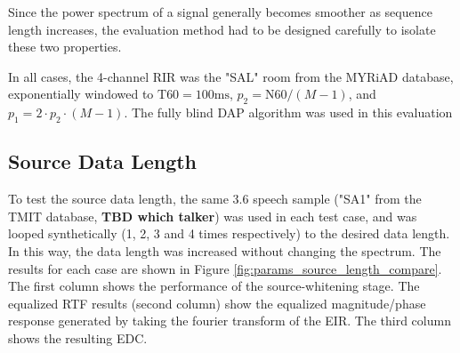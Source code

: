 Since the power spectrum of a signal generally becomes smoother as sequence length increases, the evaluation method had to be designed carefully to isolate these two properties.  

In all cases, the 4-channel RIR was the "SAL" room from the MYRiAD database, exponentially windowed to $\mathrm{T60} = 100 \unit{\milli\second}$, $p_2 = \mathrm{N60} / \left(M-1\right)$, and $p_1 = 2 \cdot p_2 \cdot \left(M-1\right)$. The fully blind DAP algorithm was used in this evaluation


\subsection{Source Data Length}

To test the source data length, the same \qty{3.6}{\sec} speech sample ("SA1" from the TMIT database, \textbf{TBD which talker}) was used in each test case, and was looped synthetically (1, 2, 3 and 4 times respectively) to the desired data length. In this way, the data length was increased without changing the spectrum. The results for each case are shown in Figure \ref{fig:params_source_length_compare}. The first column shows the performance of the source-whitening stage. The equalized RTF results (second column) show the equalized magnitude/phase response generated by taking the fourier transform of the EIR. The third column shows the resulting EDC.




